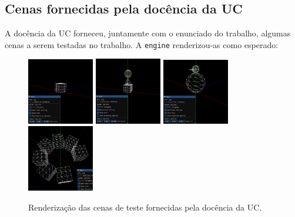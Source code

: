 \documentclass[12pt, a4paper]{article}
\begin{document}
\subsection{Cenas fornecidas pela docência da UC}

A docência da UC forneceu, juntamente com o enunciado do trabalho, algumas cenas a serem testadas no
trabalho. A \texttt{engine} renderizou-as como esperado:

\begin{figure}[H]
    \begin{adjustwidth}{-2cm}{-2cm}
        \centering
        \includegraphics[width=0.26\textwidth]{res/phase2/results/Test1.png}
        \includegraphics[width=0.26\textwidth]{res/phase2/results/Test2.png}
        \includegraphics[width=0.26\textwidth]{res/phase2/results/Test3.png}
        \includegraphics[width=0.26\textwidth]{res/phase2/results/Test4.png}
        \caption{Renderização das cenas de teste fornecidas pela docência da UC.}
    \end{adjustwidth}
\end{figure}
\end{document}
